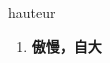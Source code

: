 
\begin{frame}
{\huge hauteur}
\begin{center}
\begin{enumerate}\Large
  \item \textbf{傲慢，自大}
\end{enumerate}
\end{center}
\end{frame}
